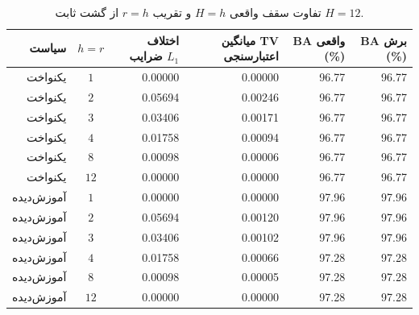 \begin{table}[htbp]
\centering\scriptsize
\caption{تفاوت سقف واقعی $H=h$ و تقریب $r=h$ از گشت ثابت $H=12$.}
\label{tab:ch4-e09-true-vs-truncated}
\begin{tabular}{rcrrrr}\hline
سیاست & $h=r$ & اختلاف ضرایب $L_1$ & میانگین TV اعتبارسنجی & BA واقعی (\%) & BA برش (\%)\\\hline
یکنواخت & $1$ & 0.00000 & 0.00000 & 96.77 & 96.77\\
یکنواخت & $2$ & 0.05694 & 0.00246 & 96.77 & 96.77\\
یکنواخت & $3$ & 0.03406 & 0.00171 & 96.77 & 96.77\\
یکنواخت & $4$ & 0.01758 & 0.00094 & 96.77 & 96.77\\
یکنواخت & $8$ & 0.00098 & 0.00006 & 96.77 & 96.77\\
یکنواخت & $12$ & 0.00000 & 0.00000 & 96.77 & 96.77\\
\hline
آموزش‌دیده & $1$ & 0.00000 & 0.00000 & 97.96 & 97.96\\
آموزش‌دیده & $2$ & 0.05694 & 0.00120 & 97.96 & 97.96\\
آموزش‌دیده & $3$ & 0.03406 & 0.00102 & 97.96 & 97.96\\
آموزش‌دیده & $4$ & 0.01758 & 0.00066 & 97.28 & 97.28\\
آموزش‌دیده & $8$ & 0.00098 & 0.00005 & 97.28 & 97.28\\
آموزش‌دیده & $12$ & 0.00000 & 0.00000 & 97.28 & 97.28\\
\hline
\end{tabular}
\end{table}
